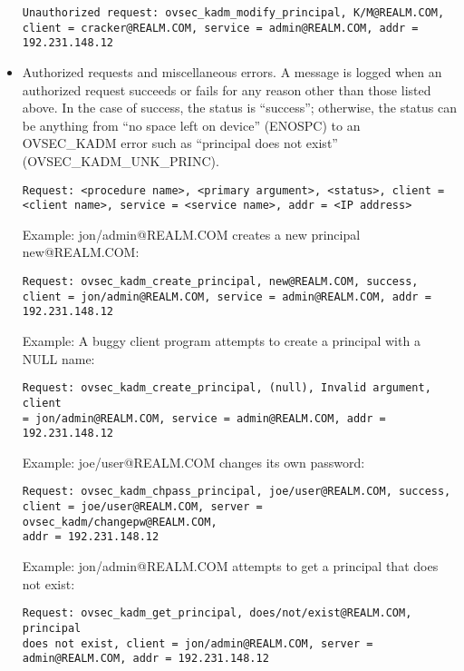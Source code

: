 \begin{itemize}
\begin{verbatim}
Unauthorized request: ovsec_kadm_modify_principal, K/M@REALM.COM,
client = cracker@REALM.COM, service = admin@REALM.COM, addr =
192.231.148.12
\end{verbatim}

\item Authorized requests and miscellaneous errors.  A message is
logged when an authorized request succeeds or fails for any reason
other than those listed above.  In the case of success, the status is
``success''; otherwise, the status can be anything from ``no space
left on device'' (ENOSPC) to an OVSEC_KADM error such as ``principal
does not exist'' (OVSEC_KADM_UNK_PRINC).

\begin{verbatim}
Request: <procedure name>, <primary argument>, <status>, client =
<client name>, service = <service name>, addr = <IP address>
\end{verbatim}

Example: jon/admin@REALM.COM creates a new principal new@REALM.COM:

\begin{verbatim}
Request: ovsec_kadm_create_principal, new@REALM.COM, success,
client = jon/admin@REALM.COM, service = admin@REALM.COM, addr =
192.231.148.12
\end{verbatim}

Example: A buggy client program attempts to create a principal with a
NULL name:

\begin{verbatim}
Request: ovsec_kadm_create_principal, (null), Invalid argument, client
= jon/admin@REALM.COM, service = admin@REALM.COM, addr =
192.231.148.12
\end{verbatim}

Example: joe/user@REALM.COM changes its own password:

\begin{verbatim}
Request: ovsec_kadm_chpass_principal, joe/user@REALM.COM, success,
client = joe/user@REALM.COM, server = ovsec_kadm/changepw@REALM.COM,
addr = 192.231.148.12
\end{verbatim}

Example: jon/admin@REALM.COM attempts to get a principal that does not
exist:

\begin{verbatim}
Request: ovsec_kadm_get_principal, does/not/exist@REALM.COM, principal
does not exist, client = jon/admin@REALM.COM, server =
admin@REALM.COM, addr = 192.231.148.12
\end{verbatim}

\end{itemize}

